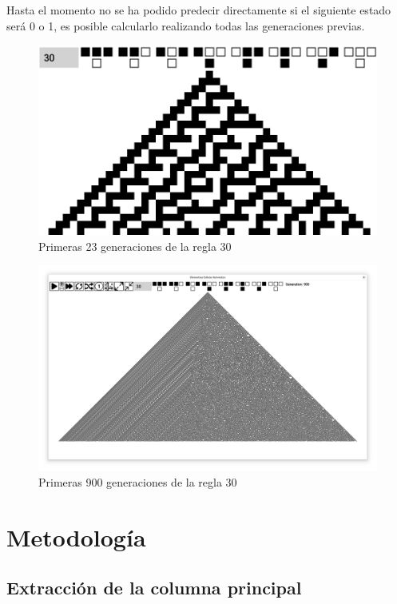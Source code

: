 \documentclass[12pt,twoside]{article}
\begin{document}
	Hasta el momento no se ha podido predecir directamente si el siguiente estado será 0 o 1, es posible calcularlo realizando todas las generaciones previas.
	
	\begin{figure}[H]
		\centering
		\includegraphics[width=\textwidth]{img/r30_1.png}
		\caption{Primeras 23 generaciones de la regla 30}
		\label{img:r30_1}
	\end{figure}
	
	\begin{figure}[H]
		\centering
		\includegraphics[width=\textwidth]{img/r30_2.png}
		\caption{Primeras 900 generaciones de la regla 30}
		\label{img:r30_2}
	\end{figure}
	
	\section{Metodología}
	
	\subsection{Extracción de la columna principal}
	
\end{document}
